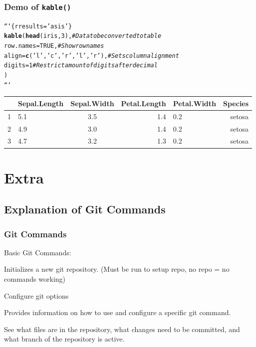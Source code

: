 \documentclass{beamer}\usepackage[]{graphicx}\usepackage[]{color}
\makeatletter
\newcommand{\hlstr}[1]{\textcolor[rgb]{0.192,0.494,0.8}{#1}}%
\newcommand{\hlcom}[1]{\textcolor[rgb]{0.678,0.584,0.686}{\textit{#1}}}%
\newcommand{\hlkwd}[1]{\textcolor[rgb]{0.737,0.353,0.396}{\textbf{#1}}}%
\newenvironment{kframe}{%
 \def\at@end@of@kframe{}%
 \ifinner\ifhmode%
  \def\at@end@of@kframe{\end{minipage}}%
  \begin{minipage}{\columnwidth}%
 \fi\fi%
 \def\FrameCommand##1{\hskip\@totalleftmargin \hskip-\fboxsep
 \colorbox{shadecolor}{##1}\hskip-\fboxsep
     \hskip-\linewidth \hskip-\@totalleftmargin \hskip\columnwidth}%
 \MakeFramed {\advance\hsize-\width
   \@totalleftmargin\z@ \linewidth\hsize
   \@setminipage}}%
 {\par\unskip\endMakeFramed%
 \at@end@of@kframe}
\newenvironment{knitrout}{}{} %
\makeatother
\begin{document}
\begin{frame}[fragile]
\frametitle{Demo of \texttt{kable()}}

\begin{knitrout}
\color{fgcolor}\begin{kframe}
\begin{alltt}
```\{r results=\hlstr{'asis'}\}
\hlkwd{kable}(\hlkwd{head}(iris,3),   \hlcom{# Data to be converted to table}
      row.names=TRUE, \hlcom{# Show rownames}
      align=\hlkwd{c}(\hlstr{'l'}, \hlstr{'c'}, \hlstr{'r'}, \hlstr{'l'}, \hlstr{'r'}), \hlcom{# Sets column alignment}
      digits=1        \hlcom{# Restrict amount of digits after decimal}
      )
```
\end{alltt}
\end{kframe}
\end{knitrout}


\begin{tabular}{l|l|c|r|l|r}
\hline
  & Sepal.Length & Sepal.Width & Petal.Length & Petal.Width & Species\\
\hline
1 & 5.1 & 3.5 & 1.4 & 0.2 & setosa\\
\hline
2 & 4.9 & 3.0 & 1.4 & 0.2 & setosa\\
\hline
3 & 4.7 & 3.2 & 1.3 & 0.2 & setosa\\
\hline
\end{tabular}


\end{frame}


\section{Extra}
\subsection{Explanation of Git Commands}

\begin{frame}
\frametitle{Git Commands}
Basic Git Commands:
\begin{description}[labelsep=1in, labelindent=.5cm]
\item[git init:] Initializes a new git repository. (Must be run to setup repo, no repo = no commands working)
\item[git config $<$option$>$:] Configure git options 
\item[git help $<$command$>$:] Provides information on how to use and configure a specific git command.
\item[git status:] See what files are in the repository, what changes need to be committed, and what branch of the repository is active.
\end{description}
\end{frame}
\end{document}
